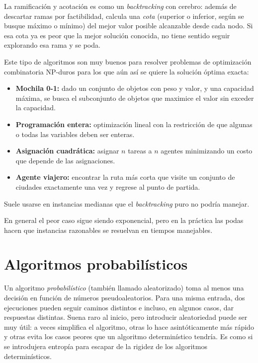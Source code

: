 \documentclass[12pt,letterpaper]{article}
\begin{document}
La ramificación y acotación es como un \emph{backtracking} con cerebro: además 
de descartar ramas por factibilidad, calcula una \emph{cota} (superior o 
inferior, según se busque máximo o mínimo) del mejor valor posible alcanzable 
desde cada nodo. Si esa cota ya es peor que la mejor solución conocida, no 
tiene sentido seguir explorando esa rama y se poda.

Este tipo de algoritmos son muy buenos para resolver problemas de optimización 
combinatoria \textsf{NP}-duros para los que aún así se quiere la solución 
óptima exacta: 

\begin{itemize}
    \item \textbf{Mochila 0-1:} dado un conjunto de objetos con peso y valor, 
    y una capacidad máxima, se busca el subconjunto de objetos que maximice el 
    valor sin exceder la capacidad.
    \item \textbf{Programación entera:} optimización lineal con la restricción 
    de que algunas o todas las variables deben ser enteras.
    \item \textbf{Asignación cuadrática:} asignar $n$ tareas a $n$ agentes 
    minimizando un costo que depende de las asignaciones.
    \item \textbf{Agente viajero:} encontrar la ruta más corta que visite un 
    conjunto de ciudades exactamente una vez y regrese al punto de partida.
\end{itemize}

Suele usarse en instancias medianas que el \emph{backtracking} puro no podría 
manejar.

En general el peor caso sigue siendo exponencial, pero en la práctica las podas 
hacen que instancias razonables se resuelvan en tiempos manejables.

\section{Algoritmos probabilísticos}
\label{sec:prob}

Un algoritmo \emph{probabilístico} (también llamado aleatorizado) toma al menos 
una decisión en función de números pseudoaleatorios. Para una misma entrada, 
dos ejecuciones pueden seguir caminos distintos e incluso, en algunos casos, 
dar respuestas distintas. Suena raro al inicio, pero introducir aleatoriedad 
puede ser muy útil: a veces simplifica el algoritmo, otras lo hace 
asintóticamente más rápido y otras evita los casos peores que un algoritmo 
determinístico tendría. Es como si se introdujera entropía para escapar de la 
rigidez de los algoritmos determinísticos.
\end{document}
